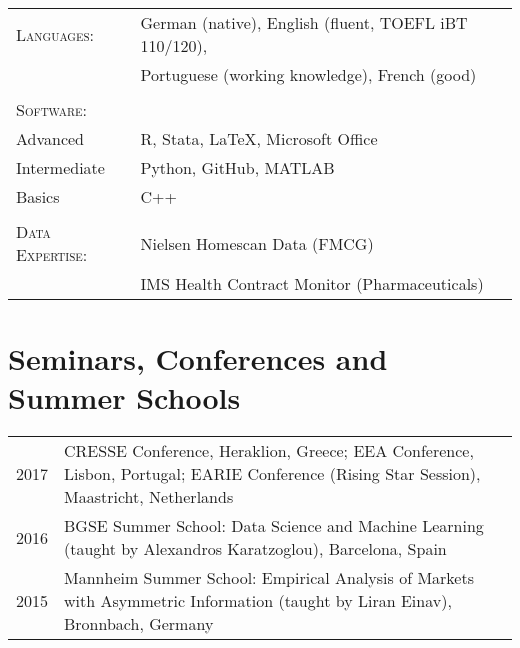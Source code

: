 \documentclass[a4paper,10pt]{article} %
\begin{document}
\begin{tabular}{P{4.5cm} P{10cm}}
\textsc{Languages:} &  German (native), English (fluent, TOEFL iBT 110/120), \\
& Portuguese (working knowledge), French (good)\\
\\
\textsc{Software:} &  \\
Advanced &  R, Stata,  \LaTeX, Microsoft Office \\
Intermediate & Python, GitHub, MATLAB \\
Basics & C++ \\
\\
\textsc{Data Expertise:} & Nielsen Homescan Data (FMCG) \\
 & IMS Health Contract Monitor (Pharmaceuticals)\\
\end{tabular}




\section{Seminars, Conferences and Summer Schools}

\begin{tabular}{P{4.5cm} P{10cm}}	

\textsc{2017}  & CRESSE Conference, Heraklion, Greece; 
 EEA Conference, Lisbon, Portugal; EARIE Conference (Rising Star Session), Maastricht, Netherlands
 \\[0.2cm]
\textsc{2016}  & BGSE Summer School: Data Science and Machine Learning
 (taught by Alexandros Karatzoglou), Barcelona, Spain \\[0.2cm]

\textsc{2015}  & Mannheim Summer School: Empirical Analysis of Markets with Asymmetric
Information (taught by Liran Einav), Bronnbach, Germany \\[0.2cm]

\end{tabular}



\end{document}
